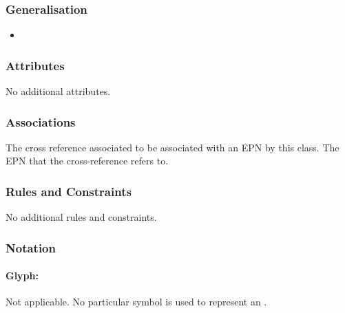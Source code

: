\subsubsection{Generalisation}

\begin{itemize}
\item {}
\end{itemize}

\subsubsection{Attributes}

No additional attributes.

\subsubsection{Associations}

\begin{attributes}
 The cross reference
associated to be associated with an EPN by this class.
 The EPN that the
cross-reference refers to.
\end{attributes}

\subsubsection{Rules and Constraints}

No additional rules and constraints.

\subsubsection{Notation}

\paragraph{Glyph:  }\label{sec:techref:equivalenceArc}

\begin{glyphDescription}
 \glyphSboTerm Not applicable.
 \glyphEndPoint No particular symbol is used to represent an .
 \end{glyphDescription}

